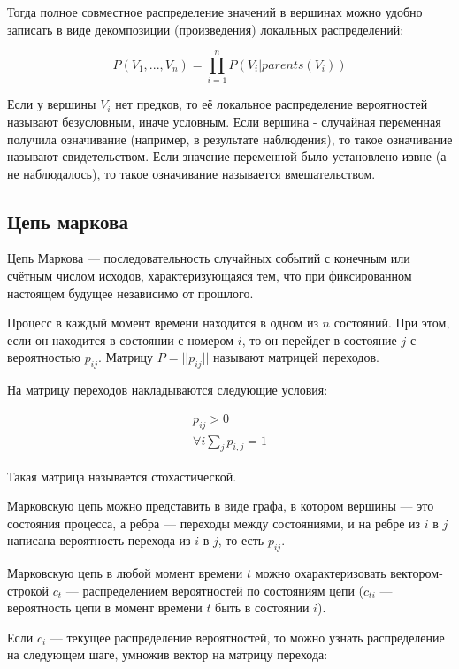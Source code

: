 Тогда полное совместное распределение значений в вершинах можно удобно записать в виде декомпозиции (произведения) локальных распределений:

\begin{equation}
	P(V_1,...,V_n)=\prod_{i=1}^{n}P(V_i|parents(V_i))
\end{equation}

Если у вершины $V_i$ нет предков, то её локальное распределение вероятностей называют безусловным, иначе условным. Если вершина - случайная переменная получила означивание (например, в результате наблюдения), то такое означивание называют свидетельством. Если значение переменной было установлено извне (а не наблюдалось), то такое означивание называется вмешательством.

\subsection{Цепь маркова}

Цепь Маркова — последовательность случайных событий с конечным или счётным числом исходов, характеризующаяся тем, что при фиксированном настоящем будущее независимо от прошлого.

Процесс в каждый момент времени находится в одном из $n$ состояний. 
При этом, если он находится в состоянии с номером $i$, то он перейдет в состояние $j$ с вероятностью $p_{ij}$.
Матрицу $P=||p_{ij}||$ называют матрицей переходов.

На матрицу переходов накладываются следующие условия: 

\begin{subequations}
\begin{align}
  p_{ij}>0 \\
  \forall i \sum_j p_{i,j}=1
\end{align}
\end{subequations}

Такая матрица называется стохастической.

Марковскую цепь можно представить в виде графа, в котором вершины — это состояния процесса, а ребра — переходы между состояниями, и на ребре из $i$ в $j$ написана вероятность перехода из $i$ в $j$, то есть $p_{ij}$. 

Марковскую цепь в любой момент времени $t$ можно охарактеризовать вектором-строкой $c_t$ — распределением вероятностей по состояниям цепи ($c_{ti}$ — вероятность цепи в момент времени $t$ быть в состоянии $i$). 

Если $c_i$ — текущее распределение вероятностей, то можно узнать распределение на следующем шаге, умножив вектор на матрицу перехода: 

